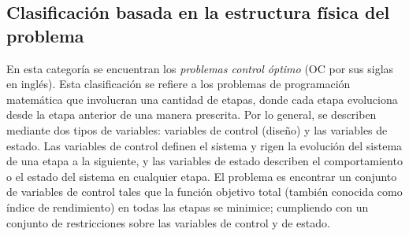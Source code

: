  \subsection{Clasificación basada en la estructura física del problema} 
En esta categoría se encuentran los \textit{problemas control óptimo } (OC por sus siglas en inglés). Esta clasificación se refiere a los problemas de programación matemática que involucran una cantidad de etapas, donde cada etapa evoluciona desde la etapa anterior de una manera prescrita. Por lo general, se describen mediante dos tipos de variables: variables de control (diseño) y las variables de estado. Las variables de control definen el sistema y rigen la evolución del sistema de una etapa a la siguiente, y las variables de estado describen el comportamiento o el estado del sistema en cualquier etapa. El problema es encontrar un conjunto de variables de control tales que la función objetivo total (también conocida como índice de rendimiento) en todas las etapas se minimice; cumpliendo con un conjunto de restricciones sobre las variables de control y de estado.

